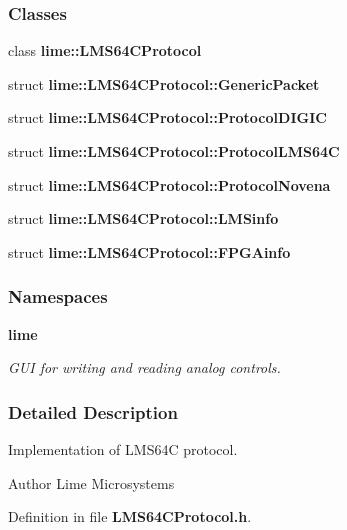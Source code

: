 \subsubsection*{Classes}
\begin{DoxyCompactItemize}
\item 
class {\bf lime\+::\+L\+M\+S64\+C\+Protocol}
\item 
struct {\bf lime\+::\+L\+M\+S64\+C\+Protocol\+::\+Generic\+Packet}
\item 
struct {\bf lime\+::\+L\+M\+S64\+C\+Protocol\+::\+Protocol\+D\+I\+G\+IC}
\item 
struct {\bf lime\+::\+L\+M\+S64\+C\+Protocol\+::\+Protocol\+L\+M\+S64C}
\item 
struct {\bf lime\+::\+L\+M\+S64\+C\+Protocol\+::\+Protocol\+Novena}
\item 
struct {\bf lime\+::\+L\+M\+S64\+C\+Protocol\+::\+L\+M\+Sinfo}
\item 
struct {\bf lime\+::\+L\+M\+S64\+C\+Protocol\+::\+F\+P\+G\+Ainfo}
\end{DoxyCompactItemize}
\subsubsection*{Namespaces}
\begin{DoxyCompactItemize}
\item 
 {\bf lime}
\begin{DoxyCompactList}\small\item\em G\+UI for writing and reading analog controls. \end{DoxyCompactList}\end{DoxyCompactItemize}


\subsubsection{Detailed Description}
Implementation of L\+M\+S64C protocol. 

\begin{DoxyAuthor}{Author}
Lime Microsystems 
\end{DoxyAuthor}


Definition in file {\bf L\+M\+S64\+C\+Protocol.\+h}.


